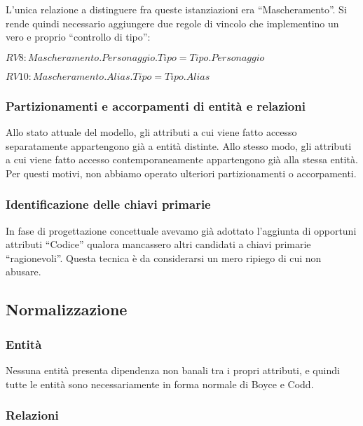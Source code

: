 \documentclass{article}
\begin{document}
L'unica
relazione a distinguere fra queste istanziazioni era ``Mascheramento''. Si rende
quindi necessario aggiungere due regole di vincolo che implementino un vero e
proprio ``controllo di tipo'':

\begin{math}
	RV8: Mascheramento.Personaggio.Tipo = Tipo.Personaggio
\end{math}

\begin{math}
	RV10: Mascheramento.Alias.Tipo = Tipo.Alias
\end{math}

\subsubsection{Partizionamenti e accorpamenti di entità e relazioni}

Allo stato attuale del modello, gli attributi a cui viene fatto accesso
separatamente appartengono già a entità distinte. Allo stesso modo, gli
attributi a cui viene fatto accesso contemporaneamente appartengono già alla
stessa entità. Per questi motivi, non abbiamo operato ulteriori partizionamenti
o accorpamenti.


\subsubsection{Identificazione delle chiavi primarie}

In fase di progettazione concettuale avevamo già adottato l'aggiunta di
opportuni attributi ``Codice'' qualora mancassero altri candidati a chiavi
primarie ``ragionevoli''. Questa tecnica è da considerarsi un mero ripiego di cui
non abusare.

\subsection{Normalizzazione}

\subsubsection{Entità}

Nessuna entità presenta dipendenza non banali tra i propri attributi, e quindi
tutte le entità sono necessariamente in forma normale di Boyce e Codd.

\subsubsection{Relazioni}
\end{document}
